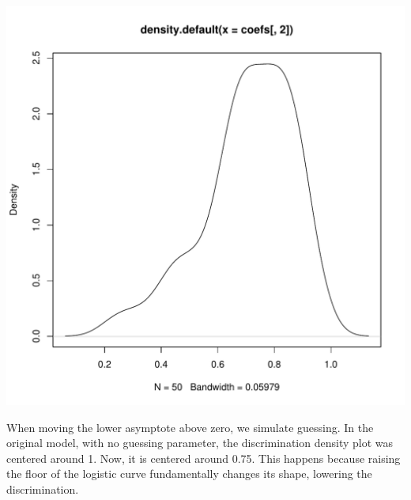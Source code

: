 \documentclass{article}\usepackage[]{graphicx}\usepackage[]{color}
\makeatletter
\def\maxwidth{ %
  \ifdim\Gin@nat@width>\linewidth
    \linewidth
  \else
    \Gin@nat@width
  \fi
}
\newenvironment{knitrout}{}{} %
\makeatother
\begin{document}
\begin{knitrout}
\color{fgcolor}
\includegraphics[width=\maxwidth]{figure/unnamed-chunk-9-1} 

\end{knitrout}

When moving the lower asymptote above zero, we simulate guessing.  In the original model, with no guessing parameter, the discrimination density plot was centered around 1.  Now, it is centered around 0.75.  This happens because raising the floor of the logistic curve fundamentally changes its shape, lowering the discrimination.
\end{document}
